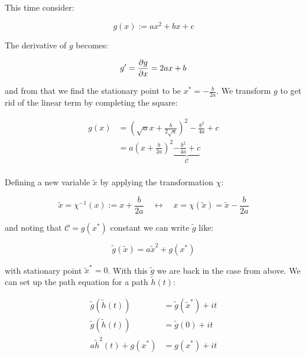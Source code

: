 \documentclass[a4paper,10pt]{article}
\begin{document}
This time consider:

\begin{equation}
 g(x) := a x^2 + b x + c
\end{equation}

The derivative of $g$ becomes:

\begin{equation}
 g^\prime = \frac{\partial g}{\partial x} = 2 a x + b
\end{equation}

and from that we find the stationary point to be $x^{*} = -\frac{b}{2a}$. We
transform $g$ to get rid of the linear term by completing the square:

\begin{equation}
\begin{split}
 g(x) & = \left(\sqrt{a} x + \frac{b}{2\sqrt{a}}\right)^2 - \frac{b^2}{4a} + c \\
      & = a \left(x + \frac{b}{2a}\right)^2 \underbrace{- \frac{b^2}{4a} + c}_{\mathcal{C}} \\
\end{split}
\end{equation}

Defining a new variable $\tilde{x}$ by applying the transformation $\chi$:

\begin{equation}
 \tilde{x} = \chi^{-1}(x) := x + \frac{b}{2a} \quad \leftrightarrow \quad x = \chi(\tilde{x}) = \tilde{x} - \frac{b}{2a}
\end{equation}

and noting that $\mathcal{C} = g\left(x^{*}\right)$ constant we
can write $\tilde{g}$ like:

\begin{equation}
 \tilde{g}\left(\tilde{x}\right) = a \tilde{x}^2 + g\left(x^{*}\right)
\end{equation}

with stationary point $\tilde{x}^{*} = 0$. With this $\tilde{g}$ we are back
in the case from above. We can set up the path equation for a path $\tilde{h}(t)$:

\begin{equation}
\begin{split}
 \tilde{g}\left(\tilde{h}(t)\right) & = \tilde{g}\left(\tilde{x}^{*}\right) + it \\
 \tilde{g}\left(\tilde{h}(t)\right) & = \tilde{g}\left(0\right) + it \\
 a \tilde{h}^2(t) + g\left(x^{*}\right) & = g\left(x^{*}\right) + it
\end{split}
\end{equation}
\end{document}
